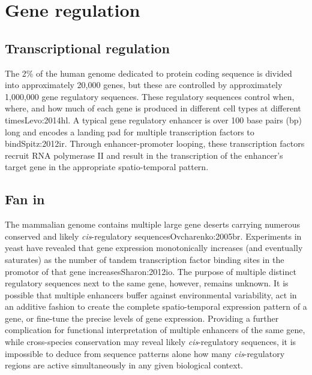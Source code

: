 \section{Gene regulation}

\subsection{Transcriptional regulation}

The 2\% of the human genome dedicated to protein coding sequence is divided into approximately 20,000 genes, but these are controlled by approximately 1,000,000 gene regulatory sequences. These regulatory sequences control when, where, and how much of each gene is produced in different cell types at different times{Levo:2014hl}. A typical gene regulatory enhancer is over 100 base pairs (bp) long and encodes a landing pad for multiple transcription factors to bind{Spitz:2012ir}. Through enhancer-promoter looping, these transcription factors recruit RNA polymerase II and result in the transcription of the enhancer's target gene in the appropriate spatio-temporal pattern.

\subsection{Fan in}

The mammalian genome contains multiple large gene deserts carrying numerous conserved and likely \emph{cis}-regulatory sequences{Ovcharenko:2005br}. Experiments in yeast have revealed that gene expression monotonically increases (and eventually saturates) as the number of tandem transcription factor binding sites in the promotor of that gene increases{Sharon:2012io}. The purpose of multiple distinct regulatory sequences next to the same gene, however, remains unknown. It is possible that multiple enhancers buffer against environmental variability, act in an additive fashion to create the complete spatio-temporal expression pattern of a gene, or fine-tune the precise levels of gene expression. Providing a further complication for functional interpretation of multiple enhancers of the same gene, while cross-species conservation may reveal likely \emph{cis}-regulatory sequences, it is impossible to deduce from sequence patterns alone how many \emph{cis}-regulatory regions are active simultaneously in any given biological context.

